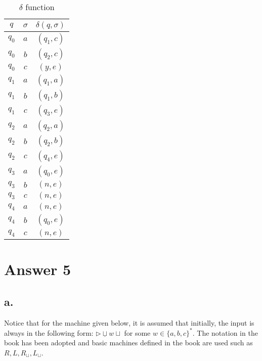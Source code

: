 \documentclass[12pt]{article}
\begin{document}
\begin{table}[H]\caption{$\delta$ function}\label{table:delta_queue}
\begin{center}
\begin{tabular}{ | c | c | c | }
\hline
$q$ & $\sigma$ & $\delta(q, \sigma)$\\
\hline
$q_0$ & $a$ & $(q_1, c)$\\
\hline
$q_0$ & $b$ & $(q_2, c)$\\
\hline
$q_0$ & $c$ & $(y, e)$\\
\hline
$q_1$ & $a$ & $(q_1, a)$\\
\hline
$q_1$ & $b$ & $(q_1, b)$\\
\hline
$q_1$ & $c$ & $(q_3, e)$\\
\hline
$q_2$ & $a$ & $(q_2, a)$\\
\hline
$q_2$ & $b$ & $(q_2, b)$\\
\hline
$q_2$ & $c$ & $(q_4, e)$\\
\hline
$q_3$ & $a$ & $(q_0, e)$\\
\hline
$q_3$ & $b$ & $(n, e)$\\
\hline
$q_3$ & $c$ & $(n, e)$\\
\hline
$q_4$ & $a$ & $(n, e)$\\
\hline
$q_4$ & $b$ & $(q_0, e)$\\
\hline
$q_4$ & $c$ & $(n, e)$\\
\hline

\end{tabular}
\end{center}
\end{table}






\section*{Answer 5}

\subsection*{a.}
Notice that for the machine given below, it is assumed that initially, the input is always in the following form: $\triangleright \underline{\sqcup} w \sqcup$ for some $w \in \{a, b, c\}^*$. The notation in the book has been adopted and basic machines defined in the book are used such as $R, L, R_{\sqcup}, L_{\sqcup}$.
\end{document}
